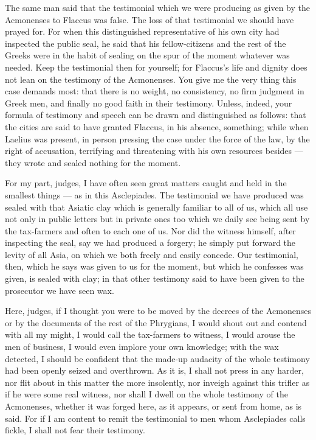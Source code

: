  The same man said that the testimonial which we were producing as given by the Acmonenses to Flaccus was false. The loss of that testimonial we should have prayed for. For when this distinguished representative of his own city had inspected the public seal, he said that his fellow-citizens and the rest of the Greeks were in the habit of sealing on the spur of the moment whatever was needed. Keep the testimonial then for yourself; for Flaccus's life and dignity does not lean on the testimony of the Acmonenses. You give me the very thing this case demands most: that there is no weight, no consistency, no firm judgment in Greek men, and finally no good faith in their testimony. Unless, indeed, your formula of testimony and speech can be drawn and distinguished as follows: that the cities are said to have granted Flaccus, in his absence, something; while when Laelius was present, in person pressing the case under the force of the law, by the right of accusation, terrifying and threatening with his own resources besides --- they wrote and sealed nothing for the moment.

 For my part, judges, I have often seen great matters caught and held in the smallest things --- as in this Asclepiades. The testimonial we have produced was sealed with that Asiatic clay which is generally familiar to all of us, which all use not only in public letters but in private ones too which we daily see being sent by the tax-farmers and often to each one of us. Nor did the witness himself, after inspecting the seal, say we had produced a forgery; he simply put forward the levity of all Asia, on which we both freely and easily concede. Our testimonial, then, which he says was given to us for the moment, but which he confesses was given, is sealed with clay; in that other testimony said to have been given to the prosecutor we have seen wax.

 Here, judges, if I thought you were to be moved by the decrees of the Acmonenses or by the documents of the rest of the Phrygians, I would shout out and contend with all my might, I would call the tax-farmers to witness, I would arouse the men of business, I would even implore your own knowledge; with the wax detected, I should be confident that the made-up audacity of the whole testimony had been openly seized and overthrown. As it is, I shall not press in any harder, nor flit about in this matter the more insolently, nor inveigh against this trifler as if he were some real witness, nor shall I dwell on the whole testimony of the Acmonenses, whether it was forged here, as it appears, or sent from home, as is said. For if I am content to remit the testimonial to men whom Asclepiades calls fickle, I shall not fear their testimony.

